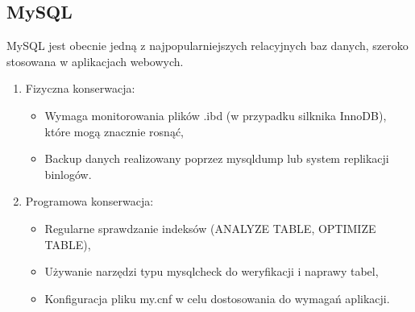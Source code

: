 \documentclass[a4paper,11pt,polish]{sphinxmanual}
\begin{document}
\subsection{MySQL}
\label{\detokenize{Kontrola_i_konserwacja/kontrola_i_konserwacja:mysql}}
\sphinxAtStartPar
MySQL jest obecnie jedną z najpopularniejszych relacyjnych baz danych, szeroko stosowana w aplikacjach webowych.
\begin{enumerate}
%
\item {} 
\sphinxAtStartPar
Fizyczna konserwacja:
\begin{itemize}
\item {} 
\sphinxAtStartPar
Wymaga monitorowania plików .ibd (w przypadku silknika InnoDB), które mogą znacznie rosnąć,

\item {} 
\sphinxAtStartPar
Backup danych realizowany poprzez mysqldump lub system replikacji binlogów.

\end{itemize}

\item {} 
\sphinxAtStartPar
Programowa konserwacja:
\begin{itemize}
\item {} 
\sphinxAtStartPar
Regularne sprawdzanie indeksów (ANALYZE TABLE, OPTIMIZE TABLE),

\item {} 
\sphinxAtStartPar
Używanie narzędzi typu mysqlcheck do weryfikacji i naprawy tabel,

\item {} 
\sphinxAtStartPar
Konfiguracja pliku my.cnf w celu dostosowania do wymagań aplikacji.

\end{itemize}

\end{enumerate}
\end{document}
